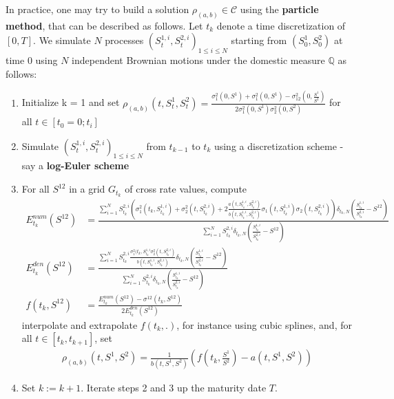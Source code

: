 \documentclass[a4paper, 12pt]{article}
\numberwithin{equation}{subsection}
\begin{document}
In practice, one may try to build a solution $\rho_{(a,b)} \in \mathcal{C}$ using the \textbf{particle method}, that can be described as follows. Let {$t_k$} denote a time discretization of $[0,T]$. We simulate $N$ processes $(S_t^{1,i},S_t^{2,i})_{1\leq i \leq N}$ starting from $(S_0^1,S_0^2)$ at time 0 using $N$ independent Brownian motions under the domestic measure $\mathbb{Q}$ as follows:
\begin{enumerate}
\item Initialize k = 1 and set $\rho_{(a,b)}(t,S_t^1,S_t^2) = \frac{\sigma_1^2(0,S^1)+\sigma_1^2(0,S^1)-\sigma_{12}^2(0,\frac{S^1}{S^2})}{2\sigma_1^2(0,S^1)\sigma_2^2(0,S^2)}$ for all $t \in [t_0 = 0; t_i]$
\item Simulate $(S_t^{1,i},S_t^{2,i})_{1\leq i \leq N}$ from $t_{k-1}$ to $t_k$ using a discretization scheme - say a \textbf{log-Euler scheme}
\item For all $S^{12}$ in a grid $G_{t_k}$ of cross rate values, compute
\begin{align}
E_{t_k}^{num}(S^{12}) &= \frac{\sum_{i=1}^{N}S_{t_k}^{2,i}\left(\sigma_1^2(t_k,S_{t_k}^{1,i}) + \sigma_2^2(t,S_{t_k}^{2,i}) + 2\frac{a(t,S_{t_k}^{1,i},S_{t_k}^{2,i})}{b(t,S_{t_k}^{1,i},S_{t_k}^{2,i})}\sigma_1 (t,S_{t_k}^{1,i})\sigma_2(t,S_{t_k}^{2,i})\right)\delta_{t_k,N}\left(\frac{S_{t_k}^{1,i}}{S_{t_k}^{2,i}} - S^{12}\right)}{\sum_{i=1}^N S_{t_k}^{2,i}\delta_{t_k,N}\left(\frac{S_{t_k}^{1,i}}{S_{t_k}^{2,i}} - S^{12}\right) }
\nonumber\\
E_{t_k}^{den}(S^{12}) &= \frac{\sum_{i=1}^{N}S_{t_k}^{2,i}\frac{\sigma_1^2(t_k,S_{t_k}^{1,i}\sigma_2^2(t,S_{t_k}^{2,i})}{b(t,S_{t_k}^{1,i},S_{t_k}^{2,i})}\delta_{t_k,N}\left(\frac{S_{t_k}^{1,i}}{S_{t_k}^{2,i}} - S^{12}\right)}{\sum_{i=1}^{N}S_{t_k}^{2,i}\delta_{t_k,N}\left(\frac{S_{t_k}^{1,i}}{S_{t_k}^{2,i}} - S^{12}\right)}
\nonumber\\
f(t_k, S^{12}) &= \frac{E_{t_k}^{num}(S^{12}) - \sigma^{12}(t_k,S^{12})}{2E_{t_k}^{den}(S^{12})}
\nonumber
\end{align}
interpolate and extrapolate $f(t_k,.)$, for instance using cubic splines, and, for all $t \in [t_k, t_{k+1}]$, set
\begin{align}
\rho_{(a,b)}(t,S^1,S^2)=\frac{1}{b(t,S^1,S^2)}\left(f\left(t_k,\frac{S^1}{S^2}\right)-a(t,S^1,S^2)\right)
\end{align}
\item Set $k := k +1$. Iterate steps 2 and 3 up the maturity date $T$.
\end{enumerate}
\end{document}
